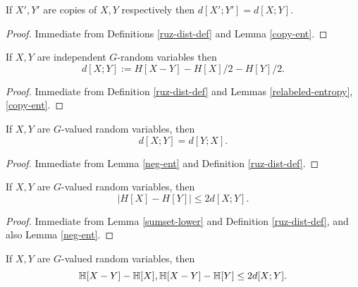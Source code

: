 \begin{lemma}\label{ruz-copy}
  If $X',Y'$ are copies of $X,Y$ respectively then $d[X';Y']=d[X;Y]$.
\end{lemma}

\begin{proof}  Immediate from Definitions \ref{ruz-dist-def} and Lemma \ref{copy-ent}.
\end{proof}

\begin{lemma}\label{ruz-indep}
  If $X,Y$ are independent $G$-random variables then
  $$ d[X;Y] := H[X - Y] - H[X]/2 - H[Y]/2.$$
\end{lemma}

\begin{proof}  Immediate from Definition \ref{ruz-dist-def} and Lemmas \ref{relabeled-entropy}, \ref{copy-ent}.
\end{proof}

\begin{lemma}\label{ruzsa-symm}
  If $X,Y$ are $G$-valued random variables, then
  $$ d[X;Y] = d[Y;X].$$
\end{lemma}

\begin{proof}  Immediate from Lemma \ref{neg-ent} and Definition \ref{ruz-dist-def}.
\end{proof}

\begin{lemma}\label{ruzsa-diff}
  If $X,Y$ are $G$-valued random variables, then
$$|H[X]-H[Y]| \leq 2 d[X;Y].$$
\end{lemma}

\begin{proof}  Immediate from Lemma \ref{sumset-lower} and Definition \ref{ruz-dist-def}, and also Lemma \ref{neg-ent}.
\end{proof}

\begin{lemma}\label{ruzsa-growth}
  If $X,Y$ are $G$-valued random variables, then
$$  \mathbb{H}[X-Y] - \mathbb{H}[X], \mathbb{H}[X-Y] - \mathbb{H}[Y] \leq 2d[X;Y].$$
\end{lemma}

